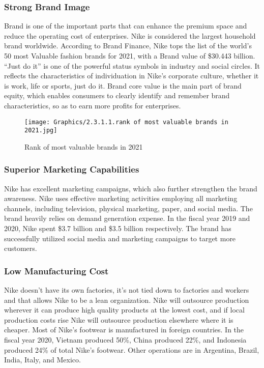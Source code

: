 \documentclass[a4paper, 12pt]{report}
\begin{document}
\subsubsection{Strong Brand Image}
Brand is one of the important parts that can enhance the premium space and reduce the operating cost of enterprises. Nike is considered the largest household brand worldwide. According to Brand Finance, Nike tops the list of the world’s 50 most Valuable fashion brands for 2021, with a Brand value of \$30.443 billion. “Just do it” is one of the powerful status symbols in industry and social circles. It reflects the characteristics of individuation in Nike's corporate culture, whether it is work, life or sports, just do it. Brand core value is the main part of brand equity, which enables consumers to clearly identify and remember brand characteristics, so as to earn more profits for enterprises.
 \begin{figure}[ht]
 			\begin{center}
				\texttt{[image: Graphics/2.3.1.1.rank of most valuable brands in 2021.jpg]}
			\end{center}
       		\caption{\label{2.3.1.1}Rank of most valuable brands in 2021}
 \end{figure}
\subsubsection{Superior Marketing Capabilities}
Nike has excellent marketing campaigns, which also further strengthen the brand awareness. Nike uses effective marketing activities employing all marketing channels, including television, physical marketing, paper, and social media. The brand heavily relies on demand generation expense. In the fiscal year 2019 and 2020, Nike spent \$3.7 billion and \$3.5 billion respectively. The brand has successfully utilized social media and marketing campaigns to target more customers.
\subsubsection{Low Manufacturing Cost}
Nike doesn't have its own factories, it's not tied down to factories and workers and that allows Nike to be a lean organization. Nike will outsource production wherever it can produce high quality products at the lowest cost, and if local production costs rise Nike will outsource production elsewhere where it is cheaper. Most of Nike’s footwear is manufactured in foreign countries. In the fiscal year 2020, Vietnam produced 50\%, China produced 22\%, and Indonesia produced 24\% of total Nike’s footwear. Other operations are in Argentina, Brazil, India, Italy, and Mexico.
\end{document}
